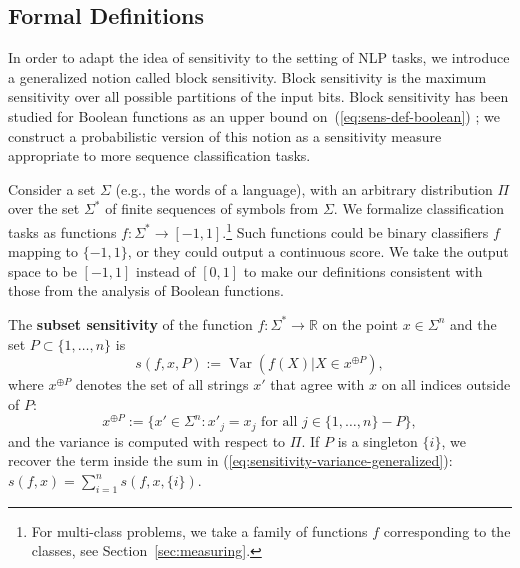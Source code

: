 \documentclass[11pt,a4paper]{article}
\begin{document}
\subsection{Formal Definitions}

In order to adapt the idea of sensitivity to the setting of NLP tasks, we introduce a generalized notion called block sensitivity. Block sensitivity is the maximum sensitivity over all possible partitions of the input bits.
Block sensitivity has been studied for Boolean functions as an upper bound on~(\ref{eq:sens-def-boolean}) \citep{nisan1991crew,bernasconi1996sensitivity,hatami2010variations}; we construct a probabilistic version of this notion as a sensitivity measure appropriate to more sequence classification tasks.

Consider a set $\Sigma$ (e.g., the words of a language), with an arbitrary distribution $\Pi$ over the set $\Sigma^*$ of finite sequences of symbols from $\Sigma$.
We formalize classification tasks as functions $f : \Sigma^* \rightarrow [-1,1]$.\footnote{For multi-class problems, we take a family of functions $f$ corresponding to the classes, see Section~\ref{sec:measuring}.} %
Such functions could be binary classifiers $f$ mapping to $\{-1, 1\}$, or they could output a continuous score.
We take the output space to be $[-1,1]$ instead of $[0,1]$ to make our definitions consistent with those from the analysis of Boolean functions. %


The \textbf{subset sensitivity} of the function $f : \Sigma^* \rightarrow \mathbb{R}$ on the point $x \in \Sigma^n$ and the set $P \subset \{1, \dots, n\}$ is
\begin{equation}\label{eq:sensitivity-variance}
	s(f,x,P) := \operatorname{Var}\left(f(X)|X \in x^{\oplus P}\right),
\end{equation}
where $x^{\oplus P}$ denotes the set of all strings $x'$ that agree with $x$ on all indices outside of $P$: 
\begin{equation}
	x^{\oplus P} := \{x' \in \Sigma^{n} : x'_j = x_j \text{ for all }j \in \{1,\dots,n\} - P \},
\end{equation}
and the variance is computed with respect to $\Pi$.
If $P$ is a singleton $\{i\}$, we recover the term inside the sum in (\ref{eq:sensitivity-variance-generalized}): $s(f,x) = \sum_{i=1}^n s(f,x,\{i\})$.
\end{document}
